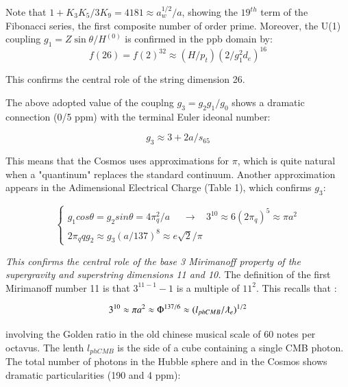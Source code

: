 \documentclass[a4paper,9pt]{article}
\newcounter{row}
\begin{document}
Note that $1 + K_3K_5/3K_9 = 4181 \approx a_w^{1/2}/a$, showing the $19^{th}$ term of the Fibonacci series, the first composite number of order prime.
Moreover, the U(1) coupling $g_1 = Z\sin \theta/H^{(0)}$ is confirmed in the ppb domain by:
\begin{equation}\label{Eq33}
 f(26) = f(2)^{32} \approx (H/p_t)(2/g_1^2 d_e)^{16}
 \end{equation}
 
 This confirms the central role of the string dimension 26.
 
 The above adopted value of the couplng $g_3 = g_2g_1/g_0$ shows a dramatic connection (0/5 ppm) with the terminal Euler ideonal number:
 
 \begin{equation}
 g_3 \approx 3 + 2a/s_{65}
\end{equation}
 
 This means that the Cosmos uses approximations for $\pi$, which is quite natural when a "quantinum" replaces the standard continuum. Another approximation appears in the Adimensional Electrical Charge (Table 1), which confirms $g_3$: 

\begin{equation}
 \left\{
    \begin{array}{ll}
  g_1 cos\theta = g_2 sin \theta = 4\pi_q^2/a     ~~~~~~ \rightarrow ~~~~ 3^{10} \approx 6(2\pi_q)^5 \approx \pi a^2 \\
 2\pi_q q g_2 \approx g_3 (a/137)^8 \approx e \sqrt2 / \pi
 
    \end{array}
\right.
\end{equation}

\textit{This confirms the central role of the base 3 Mirimanoff property of the supergravity and superstring dimensions 11 and 10.} The definition of the first Mirimanoff number 11 is that $3^{11-1}-1$ is a multiple of $11^2$. This recalls that \cite{Sanchez1}:

\begin{equation}
3^{10} \approx \pi a^2 \approx \Phi^{137/6} \approx (l_{phCMB}/\lambdabar_e)^{1/2}
\end{equation}

involving the Golden ratio in the old chinese musical scale of 60 notes per octavus. The lenth $l_{phCMB}$
is the side of a cube containing a single CMB photon. The total number of photons in the Hubble sphere and in the Cosmos shows dramatic particularities (190 and 4 ppm):
\end{document}
